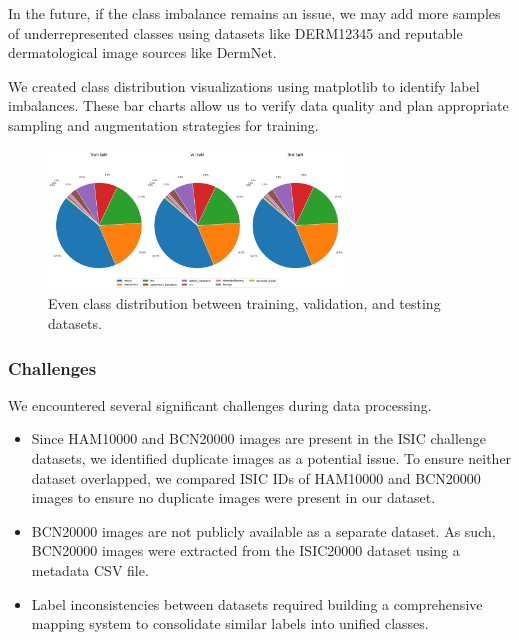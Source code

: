 \documentclass{article} %
\begin{document}
In the future, if the class imbalance remains an issue, we may add more samples of underrepresented classes using datasets like DERM12345 and reputable dermatological image sources like DermNet.

We created class distribution visualizations using matplotlib to identify label imbalances. These bar charts allow us to verify data quality and plan appropriate sampling and augmentation strategies for training.

\begin{figure}[H]
\begin{center}
\includegraphics[width=0.7\textwidth]{Figs/dataset_split_distribution.png}
\end{center}
\caption{Even class distribution between training, validation, and testing datasets.}
\label{fig:dataset_split_distribution}
\end{figure}

\subsubsection{Challenges}

We encountered several significant challenges during data processing.

\begin{itemize}
\item Since HAM10000 and BCN20000 images are present in the ISIC challenge datasets, we identified duplicate images as a potential issue. To ensure neither dataset overlapped, we compared ISIC IDs of HAM10000 and BCN20000 images to ensure no duplicate images were present in our dataset.
\item BCN20000 images are not publicly available as a separate dataset. As such, BCN20000 images were extracted from the ISIC20000 dataset using a metadata CSV file.
\item Label inconsistencies between datasets required building a comprehensive mapping system to consolidate similar labels into unified classes.
\end{itemize}
\end{document}
